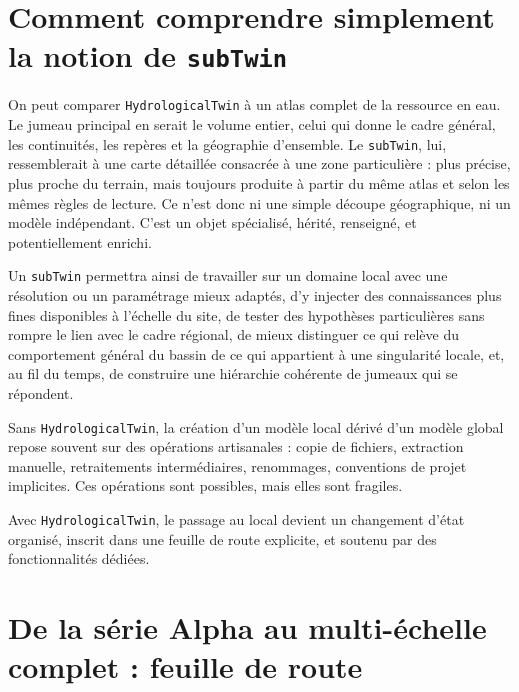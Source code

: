 \documentclass[11pt,a4paper]{article}
\newcommand{\hydrot}{\texttt{HydrologicalTwin}}
\newcommand{\subt}{\texttt{subTwin}}
\begin{document}
\section{Comment comprendre simplement la notion de \subt{}}

On peut comparer \hydrot{} à un atlas complet de la ressource en eau. Le jumeau principal en serait le volume entier, celui qui donne le cadre général, les continuités, les repères et la géographie d'ensemble. Le \subt{}, lui, ressemblerait à une carte détaillée consacrée à une zone particulière : plus précise, plus proche du terrain, mais toujours produite à partir du même atlas et selon les mêmes règles de lecture. Ce n'est donc ni une simple découpe géographique, ni un modèle indépendant. C'est un objet spécialisé, hérité, renseigné, et potentiellement enrichi.


Un \subt{} permettra ainsi de travailler sur un domaine local avec une résolution ou un paramétrage mieux adaptés, d'y injecter des connaissances plus fines disponibles à l'échelle du site, de tester des hypothèses particulières sans rompre le lien avec le cadre régional, de mieux distinguer ce qui relève du comportement général du bassin de ce qui appartient à une singularité locale, et, au fil du temps, de construire une hiérarchie cohérente de jumeaux qui se répondent.


Sans \hydrot{}, la création d'un modèle local dérivé d'un modèle global repose souvent sur des opérations artisanales : copie de fichiers, extraction manuelle, retraitements intermédiaires, renommages, conventions de projet implicites. Ces opérations sont possibles, mais elles sont fragiles.

Avec \hydrot{}, le passage au local devient un changement d'état organisé, inscrit dans une feuille de route explicite, et soutenu par des fonctionnalités dédiées. 

\section{De la série Alpha au multi-échelle complet : feuille de route}
\end{document}
